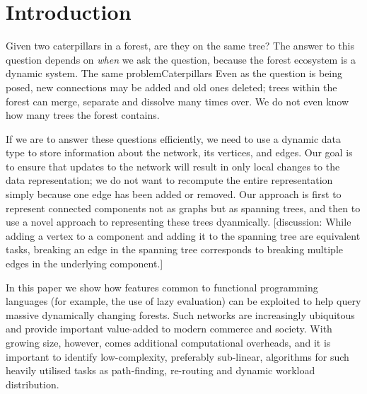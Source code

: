\documentclass{elsarticle}
\begin{document}
\maketitle

% 


\section{Introduction}
\label{sec:Intro}

Given two caterpillars in a forest, are they on the same tree? The answer to this question depends on \emph{when} we ask the question, because the forest ecosystem is a dynamic system. The same problemCaterpillars Even as the question is being posed, new connections may be added and old ones deleted; trees within the forest can merge, separate and dissolve many times over. We do not even know how many trees the forest contains.

If we are to answer these questions efficiently, we need to use a dynamic data type to store information about the network, its vertices, and edges. Our goal is to ensure that updates to the network will result in only local changes to the data representation; we do not want to recompute the entire representation simply because one edge has been added or removed. Our approach is first to represent connected components not as graphs but as spanning trees, and then to use a novel approach to representing these trees dyanmically. [discussion: While adding a vertex to a component and adding it to the spanning tree are equivalent tasks, breaking an edge in the spanning tree corresponds to breaking multiple edges in the underlying component.]

In this paper we show how features common to functional programming languages (for example, the use of lazy evaluation) can be exploited to help query massive dynamically changing forests. Such networks are increasingly ubiquitous and provide important value-added to modern commerce and society. With growing size, however, comes additional computational overheads, and it is important to identify low-complexity, preferably sub-linear, algorithms for such heavily utilised tasks as path-finding, re-routing and dynamic workload distribution.
\end{document}
